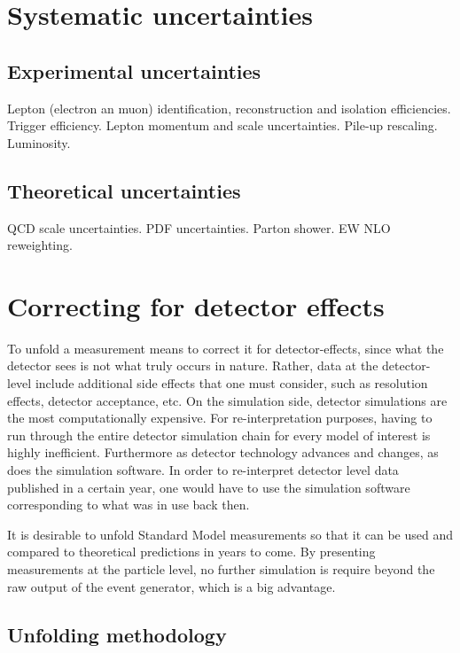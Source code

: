 
\section{Systematic uncertainties}
\label{sec:sysuncert}

\subsection{Experimental uncertainties}

Lepton (electron an muon) identification, reconstruction and isolation efficiencies.
Trigger efficiency.
Lepton momentum and scale uncertainties.
Pile-up rescaling.
Luminosity.

\subsection{Theoretical uncertainties}
QCD scale uncertainties.
PDF uncertainties.
Parton shower.
EW NLO reweighting.

\section{Correcting for detector effects}
\label{sec:unfolding}

To unfold a measurement means to correct it for detector-effects, since what the detector sees is not what truly occurs in nature. Rather, data at the detector-level include additional side effects that one must consider, such as resolution effects, detector acceptance, etc. On the simulation side, detector simulations are the most computationally expensive. For re-interpretation purposes, having to run through the entire detector simulation chain for every model of interest is highly inefficient. Furthermore as detector technology advances and changes, as does the simulation software. In order to re-interpret detector level data published in a certain year, one would have to use the simulation software corresponding to what was in use back then. 

It is desirable to unfold Standard Model measurements so that it can be used and compared to theoretical predictions in years to come. By presenting measurements at the particle level, no further simulation is require beyond the raw output of the event generator, which is a big advantage. 

\subsection{Unfolding methodology}
\label{subsec:unfmethod}

